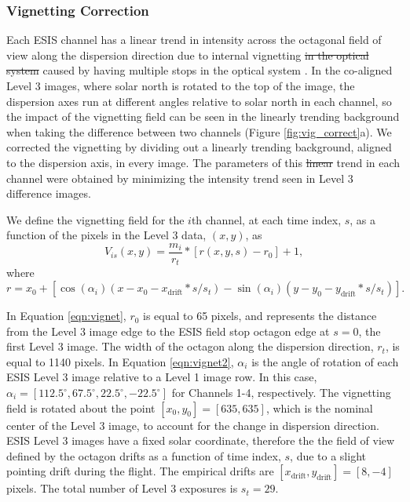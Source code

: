 \subsubsection{Vignetting Correction}
  
Each ESIS channel has a linear trend in intensity across the octagonal field of view along the dispersion direction due to internal vignetting \sout{in the optical system} caused by having multiple stops in the optical system \citep{ESIS}.
In the co-aligned Level 3 images, where solar north is rotated to the top of the image, the dispersion axes run at different angles relative to solar north in each channel, so the impact of the vignetting field can be seen in the linearly trending background when taking the difference between two channels (Figure \ref{fig:vig_correct}a).
We corrected the vignetting by dividing out a linearly trending background, aligned to the dispersion axis, in every image. The parameters of this \sout{linear} trend in each channel were obtained by minimizing the intensity trend seen in Level 3 difference images.

We define the vignetting field for the $i$th channel, at each time index, $s$, as a function of the pixels in the Level 3 data, $(x,y)$, as 
	\begin{equation}
		V_{is}(x,y) = \frac{m_i}{r_t} * [r(x,y,s) - r_0] + 1,
		\label{eqn:vignet}
	\end{equation}
where
	\begin{equation}
		r = x_0 + [\cos(\alpha_i)(x-x_0-x_{\text{drift}}*s/s_t) - \sin(\alpha_i)(y-y_0-y_{\text{drift}}*s/s_t)].
		\label{eqn:vignet2}
	\end{equation}

In Equation \ref{eqn:vignet}, $r_0$ is equal to 65 pixels, and represents the distance from the Level 3 image edge to the ESIS field stop octagon edge at $s = 0$, the first Level 3 image.
The width of the octagon along the dispersion direction, $r_t$, is equal to 1140 pixels.
In Equation \ref{eqn:vignet2},  $\alpha_i$ is the angle of rotation of each ESIS Level 3 image relative to a Level 1 image row.
In this case, $\alpha_i = [112.5^{\circ}, 67.5^{\circ}, 22.5^{\circ}, -22.5^{\circ}]$ for Channels 1-4, respectively.
The vignetting field is rotated about the point $[x_0, y_0] = [635,635]$, which is the nominal center of the Level 3 image, to account for the change in dispersion direction.
ESIS Level 3 images have a fixed solar coordinate, therefore the the field of view defined by the octagon drifts as a function of time index, $s$, due to a slight pointing drift during the flight. 
The empirical drifts are $[x_{\text{drift}},y_{\text{drift}}] = [8, -4]$ pixels. 
The total number of Level 3 exposures is $s_t=29$. 


